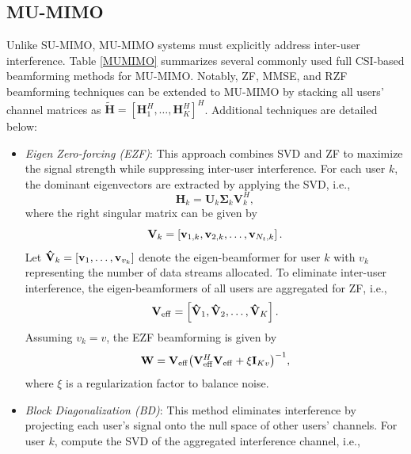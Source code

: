 \documentclass[lettersize,journal]{IEEEtran}
\begin{document}
\begin{appendices}
\subsection{MU-MIMO}

Unlike SU-MIMO, MU-MIMO systems must explicitly address inter-user interference. Table \ref{MUMIMO} summarizes several commonly used full CSI-based beamforming methods for MU-MIMO. Notably, ZF, MMSE, and RZF beamforming techniques can be extended to MU-MIMO by stacking all users' channel matrices as
$\widetilde{\mathbf{H}}=[\mathbf{H}_1^H,\ldots,\mathbf{H}_K^H]^H$. Additional techniques are detailed below:

\begin{itemize}
\item  \emph{Eigen Zero-forcing (EZF)}: This approach combines SVD and ZF to maximize the signal strength while suppressing inter-user interference. For each user $k$, the dominant eigenvectors are extracted by applying the SVD, i.e.,
\begin{equation}
\mathbf{H}_k=\mathbf{U}_k\bm{\Sigma}_k\mathbf{V}^H_k,    
\end{equation}
where the right singular matrix can be given by
\begin{equation}
{{\bf{V}}_k} = \left[ {{{\bf{v}}_{1,k}},{{\bf{v}}_{2,k}},\ldots,{{\bf{v}}_{{N_t,k}}}} \right].    
\end{equation}
Let ${{{\bf{\hat V}}}_k} = \left[ {{{\bf{v}}_1},\ldots,{{\bf{v}}_{v_k}}} \right]$ denote the eigen-beamformer for user $k$ with $v_k$ representing the number of data streams allocated. To eliminate inter-user interference, the eigen-beamformers of all users are aggregated for ZF, i.e., 
\begin{equation}
{{\bf{V}}_{{\rm{eff}}}} = \left[ {{{{\bf{\hat V}}}_1},{{{\bf{\hat V}}}_2},\ldots,{{{\bf{\hat V}}}_K}} \right].    
\end{equation}
Assuming $v_k=v$, the EZF beamforming is given by
\begin{equation}
{\bf{W}} = {{\bf{V}}_{{\rm{eff}}}}{\left( {{\bf{V}}_{{\rm{eff}}}^H{{\bf{V}}_{{\rm{eff}}}} + \xi {{\bf{I}}_{Kv}}} \right)^{ - 1}},
\end{equation}
where $\xi$ is a regularization factor to balance noise.
    \item \emph{Block Diagonalization (BD)}: This method eliminates interference by projecting each user's signal onto the null space of other users' channels. For user $k$, compute the SVD of the aggregated interference channel, i.e.,
    \begin{equation}

\end{equation}
\end{itemize}
\end{appendices}
\end{document}
